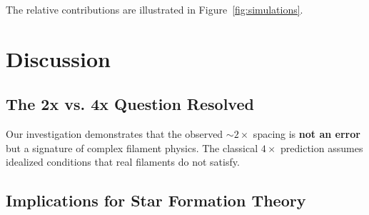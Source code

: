 \documentclass[11pt,a4paper]{article}
\begin{document}
The relative contributions are illustrated in Figure~\ref{fig:simulations}.

\section{Discussion}

\subsection{The 2x vs. 4x Question Resolved}

Our investigation demonstrates that the observed $\sim2\times$ spacing is \textbf{not an error} but a signature of complex filament physics. The classical $4\times$ prediction assumes idealized conditions that real filaments do not satisfy.

\subsection{Implications for Star Formation Theory}
\end{document}
